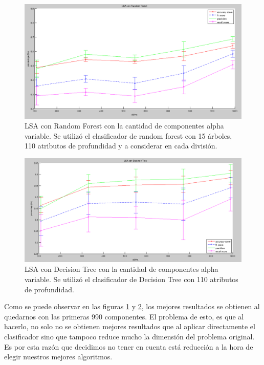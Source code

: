 \documentclass{article}
\begin{document}
\begin{figure}[H] %
\begin{center}
\includegraphics[width=500pt]{lsaRandomForest.png}
\caption{LSA con Random Forest con la cantidad de componentes alpha variable. Se utilizó el clasificador de random forest con 15 árboles, 110 atributos de profundidad y a considerar en cada división.}
\label{lsaRandomTree}
\end{center}
\end{figure}

\begin{figure}[H] %
\begin{center}
\includegraphics[width=500pt]{lsaDecisionTree.png}
\caption{LSA con Decision Tree con la cantidad de componentes alpha variable. Se utilizó el clasificador de Decision Tree con 110 atributos de profundidad.}
\label{lsaDecisionTree}
\end{center}
\end{figure}

Como se puede observar en las figuras \ref{lsaRandomTree} y \ref{lsaDecisionTree}, los mejores resultados se obtienen al quedarnos con las primeras 990 componentes. El problema de esto, es que al hacerlo, no solo no se obtienen mejores resultados que al aplicar directamente el clasificador sino que tampoco reduce mucho la dimensión del problema original. Es por esta razón que decidimos no tener en cuenta está reducción a la hora de elegir nuestros mejores algoritmos.
\end{document}
